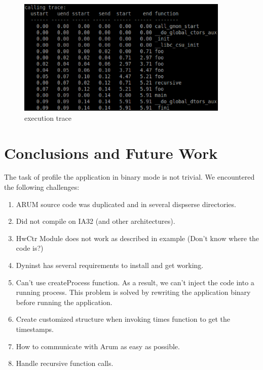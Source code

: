 \documentclass[11pt,letterpaper,oneside]{article}
\begin{document}
\begin{figure}
\begin{center}
\includegraphics[width=0.9\textwidth]{trace.eps}
\caption{execution trace}
\label{fig:trace}
\end{center}
\end{figure}

\section{Conclusions and Future Work}
\label{sec:conclusion}
The task of profile the application in binary mode is not trivial. We encountered the following challenges:
\begin{enumerate}
\item ARUM source code was duplicated and in several dispserse directories.  
\item Did not compile on IA32 (and other architectures).
\item HwCtr Module does not work as described in example (Don't know where the code is?)
\item Dyninst has several requirements to install and get working.
\item Can't use createProcess function. As a result, we can't inject the code into a running process. This problem is solved by rewriting the application binary before running the application.
\item Create customized structure when invoking times function to get the timestamps.
\item How to communicate with Arum as easy as possible.
\item Handle recursive function calls.
\end{enumerate}
\end{document}
